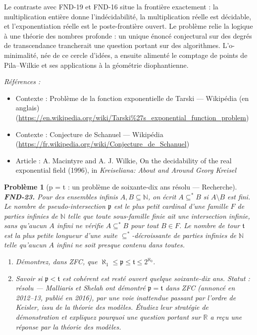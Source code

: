 \documentclass[11pt]{article}
\newtheorem{problem}{Problème}
\newenvironment{refs}{\par\small\noindent\emph{Références :}\begin{itemize}\setlength\itemsep{0pt}}{\end{itemize}\normalsize}
\begin{document}
\noindent Le contraste avec FND-19 et FND-16 situe la frontière exactement : la
multiplication entière donne l'indécidabilité, la multiplication réelle est décidable, et
l'exponentiation réelle est le poste-frontière ouvert. Le problème relie la logique à une théorie
des nombres profonde : un unique énoncé conjectural sur des degrés de transcendance trancherait
une question portant sur des algorithmes. L'o-minimalité, née de ce cercle d'idées, a ensuite
alimenté le comptage de points de Pila--Wilkie et ses applications à la géométrie
diophantienne.

\begin{refs}
\item Contexte : Problème de la fonction exponentielle de Tarski --- Wikipédia (en anglais) (\url{https://en.wikipedia.org/wiki/Tarski%27s_exponential_function_problem})
\item Contexte : Conjecture de Schanuel --- Wikipédia (\url{https://fr.wikipedia.org/wiki/Conjecture_de_Schanuel})
\item Article : A. Macintyre and A. J. Wilkie, \og{} On the decidability of the real exponential field \fg{} (1996), in \textit{Kreiseliana: About and Around Georg Kreisel}
\end{refs}

\bigskip

\begin{problem}[{p = t : un problème de soixante-dix ans résolu --- Recherche}]
\textbf{FND-23.} Pour des ensembles infinis $ A, B \subseteq \mathbb{N} $, on écrit
$ A \subseteq^{*} B $ si $ A \setminus B $ est fini. Le \textit{nombre de
pseudo-intersection} $ \mathfrak{p} $ est le plus petit cardinal d'une famille $ F $ de
parties infinies de $\mathbb{N}$ telle que toute sous-famille finie ait une intersection infinie, sans
qu'aucun $ A $ infini ne vérifie $ A \subseteq^{*} B $ pour tout $ B \in F $. Le \textit{nombre
de tour} $ \mathfrak{t} $ est la plus petite longueur d'une suite $ \subseteq^{*} $-décroissante
de parties infinies de $\mathbb{N}$ telle qu'aucun $ A $ infini ne soit presque contenu dans toutes.
\begin{enumerate}
\item[(a)] Démontrez, dans ZFC, que $ \aleph_1 \le \mathfrak{p} \le \mathfrak{t} \le 2^{\aleph_0} $.
\item[(b)] Savoir si $ \mathfrak{p} < \mathfrak{t} $ est cohérent est resté ouvert quelque soixante-dix
ans. \textit{Statut : résolu --- Malliaris et Shelah ont démontré $ \mathfrak{p} = \mathfrak{t} $
dans ZFC (annoncé en 2012--13, publié en 2016), par une voie inattendue passant par l'ordre de
Keisler, issu de la théorie des modèles.} Étudiez leur stratégie de démonstration et expliquez
pourquoi une question portant sur $\mathbb{R}$ a reçu une réponse par la théorie des modèles.
\end{enumerate}

\end{problem}
\end{document}
